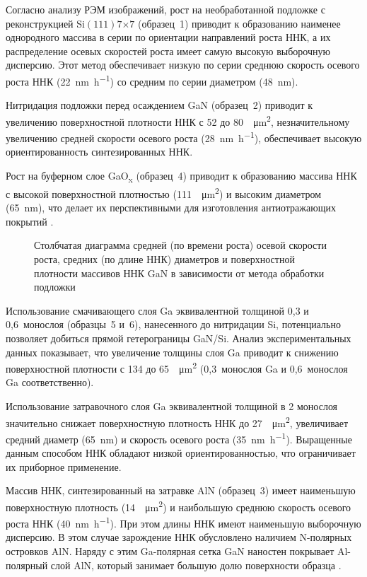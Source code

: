 Согласно анализу РЭМ изображений, рост на необработанной подложке с
реконструкцией Si\((111)7\)\(\times\)\(7\) (образец~1) приводит к образованию
наименее однородного массива в серии по ориентации направлений роста ННК, а их
распределение осевых скоростей роста имеет самую высокую выборочную дисперсию.
Этот метод обеспечивает низкую по серии среднюю скорость осевого роста ННК
(22~\si{\nano\meter\per\hour}) со средним по серии диаметром
(48~\si{\nano\meter}).

Нитридация подложки перед осаждением GaN (образец~2) приводит к увеличению
поверхностной плотности ННК с 52 до 80~\si{\per\micro\meter\squared},
незначительному увеличению средней скорости осевого роста
(28~\si{\nano\meter\per\hour}), обеспечивает высокую ориентированность
синтезированных ННК.

Рост на буферном слое GaO\textsubscript{x} (образец~4) приводит к образованию
массива ННК с высокой поверхностной плотностью
(111~\si{\per\micro\meter\squared}) и высоким диаметром (65~\si{\nano\meter}),
что делает их перспективными для изготовления антиотражающих покрытий
\cite{Mozharov2015a}.

\begin{figure}[ht]  \caption{Столбчатая
		диаграмма средней (по времени роста) осевой скорости роста, средних (по
		длине ННК) диаметров и поверхностной плотности массивов ННК GaN в
зависимости от метода обработки подложки}\label{fig:Image_28} \end{figure}

Использование смачивающего слоя Ga эквивалентной толщиной 0,3 и 0,6~монослоя
(образцы~5 и~6), нанесенного до нитридации Si, потенциально позволяет добиться
прямой гетерограницы GaN/Si. Анализ экспериментальных данных показывает, что
увеличение толщины слоя Ga приводит к снижению поверхностной плотности с 134 до
65~\si{\per\micro\meter\squared} (0,3~монослоя Ga и 0,6~монослоя Ga
соответственно).

Использование затравочного слоя Ga эквивалентной толщиной в 2 монослоя
значительно снижает поверхностную плотность ННК до
27~\si{\per\micro\meter\squared}, увеличивает средний диаметр
(65~\si{\nano\meter}) и скорость осевого роста (35~\si{\nano\meter\per\hour}).
Выращенные данным способом ННК обладают низкой ориентированностью, что
ограничивает их приборное применение.

Массив ННК, синтезированный на затравке AlN (образец~3) имеет наименьшую
поверхностную плотность (14~\si{\per\micro\meter\squared}) и наибольшую среднюю
скорость осевого роста ННК (40~\si{\nano\meter\per\hour}). При этом длины ННК
имеют наименьшую выборочную дисперсию. В этом случае зарождение ННК обусловлено
наличием N-полярных островков AlN. Наряду с этим Ga-полярная сетка GaN наностен
покрывает Al-полярный слой AlN, который занимает большую долю поверхности
образца \cite{Auzelle2015}.

